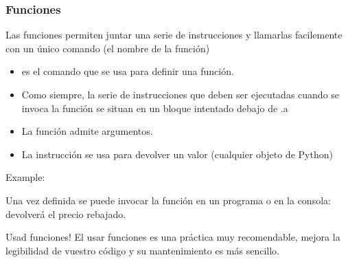 \documentclass[handout,9pt]{beamer}
\begin{document}
\begin{frame}[fragile]
  \frametitle{Funciones}
  \begin{overlayarea}{\textwidth}{\textheight}
  \begin{block}{}
    Las funciones permiten juntar una serie de instrucciones
    y llamarlas facilemente con un único comando (el nombre de la función)
  \end{block}
  \pause
  \begin{itemize}
  \item {} es el comando que se usa para definir una función.
  \item Como siempre, la serie de instrucciones que deben ser
    ejecutadas cuando se invoca la función se situan en un bloque
    intentado debajo de .a
  \item La función admite argumentos.
  \item La instrucción  se usa para devolver un valor
    (cualquier objeto de Python)
  \end{itemize}\pause
  Example:\vspace{-1cm}
  \begin{center}
  \end{center}\pause\vspace{-0.5cm}
  
Una vez definida se puede invocar la función en un programa o en la consola:
 devolverá el precio rebajado.\pause
  \begin{block}{Usad funciones!}
    El usar funciones es una práctica muy recomendable, mejora la
    legibilidad de vuestro código y su mantenimiento es más sencillo.
  \end{block}
\end{overlayarea}
\end{frame}
\end{document}
